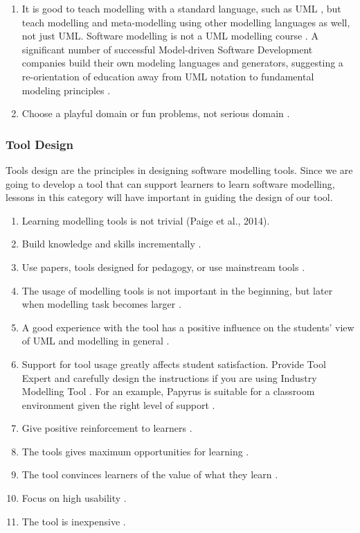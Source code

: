 \documentclass[12pt, a4paper]{report}
\begin{document}
\begin{enumerate}
\item It is good to teach modelling with a standard language, such as UML \cite{bezivin2009teaching}, but teach modelling and meta-modelling using other modelling languages as well, not just UML. Software modelling is not a UML modelling course \cite{paige2014bad}. A significant number of successful Model-driven Software Development companies build their own modeling languages and generators, suggesting a re-orientation of education away from UML notation to fundamental modeling principles \cite{whittle2013industrial}.
\item Choose a playful domain or fun problems, not serious domain \cite{paige2014bad}.
\end{enumerate}

\subsubsection{Tool Design}
Tools design are the principles in designing software modelling tools. Since we are going to develop a tool that can support learners to learn software modelling, lessons in this category will have important in guiding the design of our tool. 
\begin{enumerate}
\item Learning modelling tools is not trivial (Paige et al., 2014). 
\item Build knowledge and skills incrementally \cite{lethbridge2014teaching}.
\item Use papers, tools designed for pedagogy, or use mainstream tools \cite{Akayama2013}.
\item The usage of modelling tools is not important in the beginning, but later when modelling task becomes larger \cite{bezivin2009teaching}.
\item A good experience with the tool has a positive inﬂuence on the students’ view of UML and modelling in general \cite{liebel2015ready}.
\item Support for tool usage greatly affects student satisfaction. Provide Tool Expert and carefully design the instructions if you are using Industry Modelling Tool \cite{liebel2015ready}. For an example, Papyrus is suitable for a classroom environment given the right level of support \cite{liebel2015ready}.
\item Give positive reinforcement to learners \cite{lethbridge2014teaching}.
\item The tools gives maximum opportunities for learning \cite{lethbridge2014teaching}.
\item The tool convinces learners of the value of what they learn \cite{lethbridge2014teaching}.
\item Focus on high usability \cite{lethbridge2014teaching}.
\item The tool is inexpensive \cite{lethbridge2014teaching}.
\end{enumerate}
\end{document}
